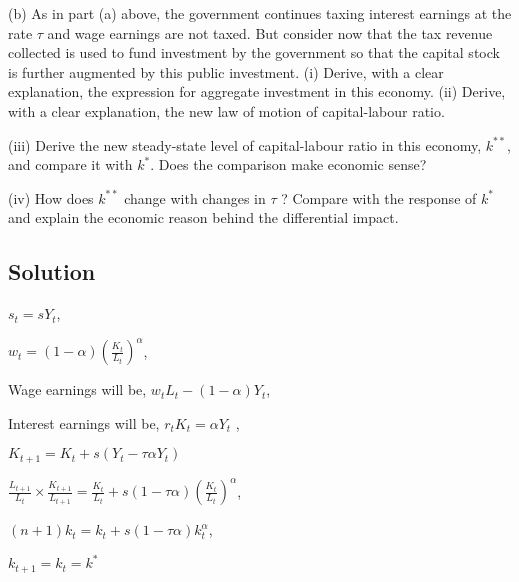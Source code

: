 (b) As in part (a) above, the government continues taxing interest earnings at the rate \(\tau\) and wage earnings are not taxed. But consider now that the tax revenue collected is used to fund investment by the government so that the capital stock is further augmented by this public investment.
(i) Derive, with a clear explanation, the expression for aggregate investment in this economy.
(ii) Derive, with a clear explanation, the new law of motion of capital-labour ratio.

(iii) Derive the new steady-state level of capital-labour ratio in this economy, \(k^{* *}\), and compare it with \(k^*\). Does the comparison make economic sense?

(iv) How does \(k^{* *}\) change with changes in \(\tau\) ? Compare with the response of \(k^*\) and explain the economic reason behind the differential impact.
\subsection*{Solution}
\(s_{t} = sY_{t} \), 

\(w_{t} = (1-\alpha)(\frac{K_{t} }{L_{t} })^{\alpha}\),

Wage earnings will be, \(w_{t} L_{t} - (1-\alpha) Y_{t} \),

Interest earnings will be, \(r_{t} K_{t}= \alpha Y_{t}  \) , 

\(K_{t+1} = K_{t} + s(Y_{t} - \tau \alpha Y_{t} )  \) 

\(\frac{L_{t+1} }{L_{t} } \times \frac{K_{t+1} }{L_{t+1} } = \frac{K_{t} }{L_{t} }+ s(1 - \tau \alpha)(\frac{K_{t} }{L_{t} })^\alpha\),

\((n+1)k_{t} = k_{t} + s(1-\tau \alpha)k_{t}^\alpha  \),

\(k_{t+1} = k_{t} = k^*\) 





